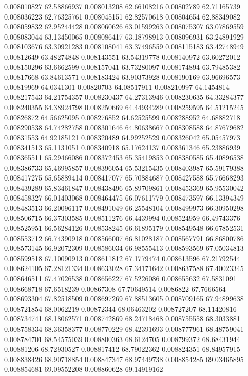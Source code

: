 0.008010827	62.58866937
0.008013208	62.66108216
0.00802789	62.71165739
0.008036223	62.76325761
0.008045151	62.82570618
0.00804654	62.88349082
0.008059832	62.95244428
0.008060626	63.01599263
0.008075307	63.07869559
0.008083044	63.13450065
0.008086417	63.18798913
0.008096931	63.24891929
0.008103676	63.30921283
0.008108041	63.37496559
0.008115183	63.42748949
0.00812649	63.48274848
0.008143551	63.54319778
0.008140972	63.60272012
0.008150296	63.6662599
0.008157041	63.73280097
0.008174894	63.79485382
0.00817668	63.84613571
0.008183424	63.90373928
0.008190169	63.96696573
0.00819969	64.0341301
0.00820703	64.08517911
0.008210997	64.1454814
0.008217543	64.21754357
0.008230437	64.27313946
0.008230635	64.33284377
0.008240355	64.38924798
0.008250669	64.44934289
0.008259595	64.51215245
0.00826872	64.56625095
0.008276852	64.62525599
0.008288952	64.68882718
0.008290538	64.74282758
0.008301646	64.80638667
0.008308588	64.87679682
0.00831553	64.92185121
0.008320489	64.99252529
0.008326042	65.05457973
0.008341513	65.1131051
0.008340918	65.17624137
0.008361346	65.23886939
0.008365511	65.29466086
0.008372453	65.35419853
0.008380585	65.40896538
0.008386733	65.46995857
0.008396054	65.53215435
0.008403987	65.59179388
0.008417275	65.65889414
0.008417077	65.70884687
0.008427588	65.76668293
0.008439289	65.83461847
0.008438496	65.89709861
0.008453369	65.95530042
0.008458327	66.01403068
0.008464475	66.07611779
0.008473597	66.13394349
0.008483513	66.20096117
0.008491049	66.25548104
0.008499973	66.30950298
0.008506715	66.37303585
0.008511276	66.4439994
0.008524959	66.49743376
0.008525951	66.56284126
0.008538245	66.61895179
0.008549548	66.67852531
0.008553712	66.74390918
0.008566007	66.81028187
0.008567791	66.86800786
0.008573145	66.92072309
0.008586034	66.98555413
0.008593569	67.05034813
0.008599518	67.10090913
0.008611812	67.1779474
0.008613596	67.21792544
0.008624105	67.28121334
0.008633028	67.34171642
0.008637588	67.40023345
0.008646511	67.47026538
0.008656227	67.5226086
0.008655632	67.5831091
0.008668718	67.6518239
0.00867308	67.70649514
0.0086822	67.7666564
0.008693304	67.82518509
0.008697269	67.88513605
0.008709165	67.94899638
0.008721854	68.0062219
0.00872344	68.06463202
0.008727207	68.11420816
0.008734741	68.18062571
0.008742869	68.24718468
0.008755558	68.3033881
0.008758334	68.36358377
0.008770229	68.42391693
0.008777961	68.48759041
0.008784701	68.54575039
0.008800363	68.6124705
0.008799372	68.68431944
0.00881206	68.72930527
0.008817412	68.79022362
0.008824351	68.84957915
0.008838426	68.90718854
0.008847347	68.97449738
0.008854285	69.03465895
0.008854681	69.09552208
0.008860628	69.14919162
